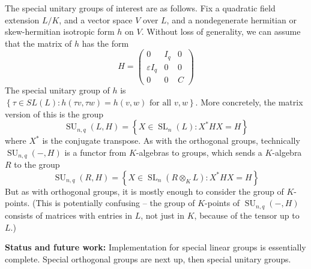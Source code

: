 \documentclass[12pt]{article}
\newcommand{\eps}{\varepsilon}
\newcommand{\lb}{\left\{}
\newcommand{\rb}{\right\}}
\newcommand{\tbf}{\textbf}
\DeclareMathOperator{\SL}{SL}
\DeclareMathOperator{\SU}{SU}
\begin{document}
\begin{mdframed}[linecolor=red]
The special unitary groups of interest are as follows. Fix a quadratic field extension $L/K$, and a vector space $V$ over $L$, and a nondegenerate hermitian or skew-hermitian isotropic form $h$ on $V$. Without loss of generality, we can assume that the matrix of $h$ has the form
\[
	H = \begin{pmatrix}
		0 & I_q & 0 \\
		\eps I_q & 0 & 0 \\
		0 & 0 & C
	\end{pmatrix}
\]
The special unitary group of $h$ is $\lb \tau \in SL(L) : h(\tau v, \tau w) = h(v,w) \text{ for all } v,w \rb$. More concretely, the matrix version of this is the group
\[
	\SU_{n,q}(L,H) = \lb X \in \SL_n(L) : X^* H X = H \rb
\]
where $X^*$ is the conjugate transpose. As with the orthogonal groups, technically $\SU_{n,q}(-,H)$ is a functor from $K$-algebras to groups, which sends a $K$-algebra $R$ to the group
\[
	\SU_{n,q}(R,H) = \lb X \in \SL_n(R \otimes_K L) : X^* H X = H \rb
\]
But as with orthogonal groups, it is mostly enough to consider the group of $K$-points. (This is potentially confusing -- the group of $K$-points of $\SU_{n,q}(-,H)$ consists of matrices with entries in $L$, not just in $K$, because of the tensor up to $L$.)

\smallskip

\tbf{Status and future work:} Implementation for special linear groups is essentially complete. Special orthogonal groups are next up, then special unitary groups.
\end{mdframed}
\end{document}

